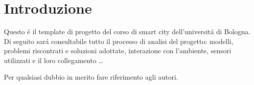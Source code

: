 \section{Introduzione}

Questo \'e il template di progetto del corso di smart city dell'universit\'a di Bologna. Di seguito sar\'a consultabile tutto il processo di analisi del progetto: modelli, problemi riscontrati e soluzioni adottate, interazione con l'ambiente, sensori utilizzati e il loro collegamento \ldots

Per qualsiasi dubbio in merito fare riferimento agli autori.
